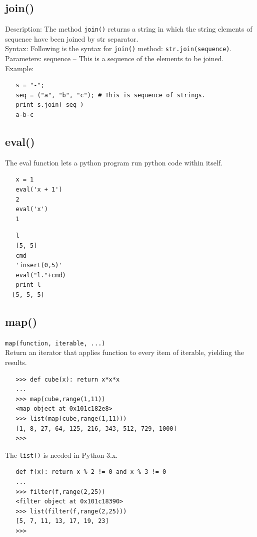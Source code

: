 \documentclass[11pt,a4paper]{article}
\begin{document}
    \subsection{join()}
    Description: The method {\tt join()} returns a string in which the string elements of sequence have been joined by str separator.\\
    Syntax: Following is the syntax for {\tt join()} method: {\tt str.join(sequence)}. \\
    Parameters: sequence -- This is a sequence of the elements to be joined. \\
    Example: 
    \begin{lstlisting}
   s = "-";
   seq = ("a", "b", "c"); # This is sequence of strings.
   print s.join( seq )
   a-b-c
  \end{lstlisting}

    \subsection{eval()}  
    The eval function lets a python program run python code within itself.
    \begin{lstlisting}
   x = 1
   eval('x + 1')
   2
   eval('x')
   1
  \end{lstlisting}
    \begin{lstlisting}
   l
   [5, 5]
   cmd
   'insert(0,5)'
   eval("l."+cmd)
   print l
  [5, 5, 5]
  \end{lstlisting}

    \subsection{map()}  
    {\tt map(function, iterable, ...)} \\
    Return an iterator that applies function to every item of iterable, yielding the results.
    \begin{lstlisting}
   >>> def cube(x): return x*x*x
   ... 
   >>> map(cube,range(1,11))
   <map object at 0x101c182e8>
   >>> list(map(cube,range(1,11)))
   [1, 8, 27, 64, 125, 216, 343, 512, 729, 1000]
   >>> 
  \end{lstlisting}
    The {\tt list()} is needed in Python 3.x. 

    \begin{lstlisting}
   def f(x): return x % 2 != 0 and x % 3 != 0
   ... 
   >>> filter(f,range(2,25))
   <filter object at 0x101c18390>
   >>> list(filter(f,range(2,25)))
   [5, 7, 11, 13, 17, 19, 23]
   >>> 
  \end{lstlisting}
\end{document}
